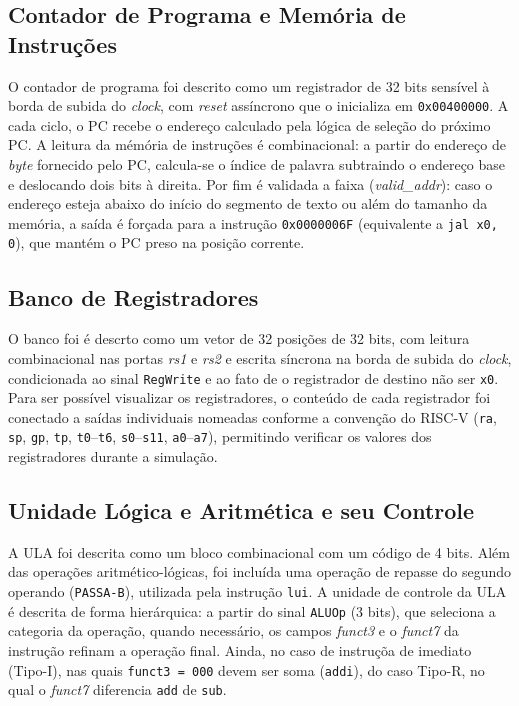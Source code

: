 \documentclass[conference]{IEEEtran}
\begin{document}
\subsection{Contador de Programa e Memória de Instruções}
O contador de programa foi descrito como um registrador de 32 bits sensível à borda de subida do
\textit{clock}, com \textit{reset} assíncrono que o inicializa em \texttt{0x00400000}. A cada ciclo, o PC
recebe o endereço calculado pela lógica de seleção do próximo PC. A leitura da mémória de instruções é combinacional: 
a partir do endereço de \textit{byte} fornecido pelo PC, calcula-se o índice de palavra subtraindo o endereço base e
deslocando dois bits à direita. Por fim é validada a faixa (\textit{valid\_addr}): caso
o endereço esteja abaixo do início do segmento de texto ou além do tamanho da memória, a saída é forçada
para a instrução \texttt{0x0000006F} (equivalente a \texttt{jal x0, 0}), que mantém o PC preso na
posição corrente.

\subsection{Banco de Registradores}
O banco foi é descrto como um vetor de 32 posições de 32 bits, com leitura combinacional nas portas
\textit{rs1} e \textit{rs2} e escrita síncrona na borda de subida do \textit{clock}, condicionada ao sinal
\texttt{RegWrite} e ao fato de o registrador de destino não ser \texttt{x0}. Para ser possível visualizar
os registradores, o conteúdo de cada registrador foi conectado a saídas individuais nomeadas conforme a convenção
do RISC-V (\texttt{ra}, \texttt{sp}, \texttt{gp}, \texttt{tp}, \texttt{t0}--\texttt{t6},
\texttt{s0}--\texttt{s11}, \texttt{a0}--\texttt{a7}), permitindo verificar os valores dos
registradores durante a simulação.

\subsection{Unidade Lógica e Aritmética e seu Controle}
A ULA foi descrita como um bloco combinacional com um código de 4 bits.
Além das operações aritmético-lógicas, foi incluída uma operação de repasse do segundo operando (\texttt{PASSA-B}), 
utilizada pela instrução \texttt{lui}. A unidade de controle da ULA é descrita de forma hierárquica: a partir do sinal
\texttt{ALUOp} (3 bits), que seleciona a categoria da operação, quando necessário, os campos \textit{funct3}
e o \textit{funct7} da instrução refinam a operação final. Ainda, no caso de instruçõa de
imediato (Tipo-I), nas quais \texttt{funct3 = 000} devem ser soma (\texttt{addi}), do caso
Tipo-R, no qual o \textit{funct7} diferencia \texttt{add} de \texttt{sub}.
\end{document}
